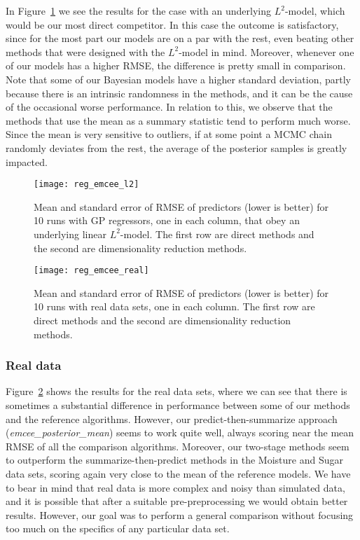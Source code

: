 \documentclass{article}
\numberwithin{equation}{section}
\theoremstyle{plain}
\begin{document}
In Figure~\ref{fig:reg_emcee_l2} we see the results for the case with an underlying \(L^2\)-model, which would be our most direct competitor. In this case the outcome is satisfactory, since for the most part our models are on a par with the rest, even beating other methods that were designed with the \(L^2\)-model in mind. Moreover, whenever one of our models has a higher RMSE, the difference is pretty small in comparison. Note that some of our Bayesian models have a higher standard deviation, partly because there is an intrinsic randomness in the methods, and it can be the cause of the occasional worse performance. In relation to this, we observe that the methods that use the mean as a summary statistic tend to perform much worse. Since the mean is very sensitive to outliers, if at some point a MCMC chain randomly deviates from the rest, the average of the posterior samples is greatly impacted.

\begin{figure}[ht!]
  \centering
  \texttt{[image: reg\_emcee\_l2]}
  \caption{Mean and standard error of RMSE of predictors (lower is better) for 10 runs with GP regressors, one in each column, that obey an underlying linear \(L^2\)-model. The first row are direct methods and the second are dimensionality reduction methods.}\label{fig:reg_emcee_l2}
\end{figure}

\begin{figure}[ht!]
  \centering
  \texttt{[image: reg\_emcee\_real]}
  \caption{Mean and standard error of RMSE of predictors (lower is better) for 10 runs with real data sets, one in each column. The first row are direct methods and the second are dimensionality reduction methods.}\label{fig:reg_emcee_real}
\end{figure}

\subsubsection*{Real data}

Figure~\ref{fig:reg_emcee_real} shows the results for the real data sets, where we can see that there is sometimes a substantial difference in performance between some of our methods and the reference algorithms. However, our predict-then-summarize approach (\textit{emcee\_posterior\_mean}) seems to work quite well, always scoring near the mean RMSE of all the comparison algorithms. Moreover, our two-stage methods seem to outperform the summarize-then-predict methods in the Moisture and Sugar data sets, scoring again very close to the mean of the reference models. We have to bear in mind that real data is more complex and noisy than simulated data, and it is possible that after a suitable pre-preprocessing we would obtain better results. However, our goal was to perform a general comparison without focusing too much on the specifics of any particular data set.
\end{document}
